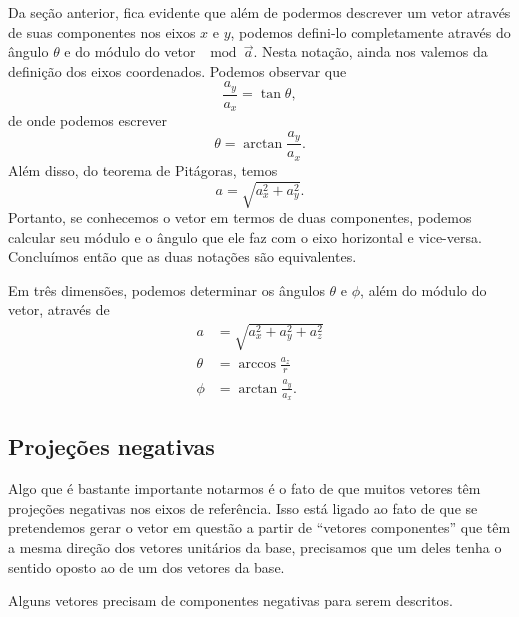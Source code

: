 Da seção anterior, fica evidente que além de podermos descrever um vetor através de suas componentes nos eixos $x$ e $y$, podemos defini-lo completamente através do ângulo $\theta$ e do módulo do vetor $\mod{\vec{a}}$. Nesta notação, ainda nos valemos da definição dos eixos coordenados. Podemos observar que
\begin{equation}
  \frac{a_y}{a_x} = \tan\theta,
\end{equation}
%
de onde podemos escrever
\begin{equation}
  \theta = \arctan\frac{a_y}{a_x}.
\end{equation}
%
Além disso, do teorema de Pitágoras, temos
\begin{equation}
  a = \sqrt{a_ x^2 + a_y^2}.
\end{equation}
%
Portanto, se conhecemos o vetor em termos de duas componentes, podemos calcular seu módulo e o ângulo que ele faz com o eixo horizontal e vice-versa. Concluímos então que as duas notações são equivalentes.

Em três dimensões, podemos determinar os ângulos $\theta$ e $\phi$, além do módulo do vetor, através de
\begin{align}
    a &= \sqrt{a_x^2 + a_y^2 + a_z^2} \\
    \theta &= \arccos \frac{a_z}{r} \\
    \phi &= \arctan \frac{a_y}{a_x}.
\end{align}

\subsection{Projeções negativas}

Algo que é bastante importante notarmos é o fato de que muitos vetores têm projeções negativas nos eixos de referência. Isso está ligado ao fato de que se pretendemos gerar o vetor em questão a partir de ``vetores componentes'' que têm a mesma direção dos vetores unitários da base, precisamos que um deles tenha o sentido oposto ao de um dos vetores da base.

\begin{marginfigure}
\centering
{}
\caption{Alguns vetores precisam de componentes negativas para serem descritos. \label{Fig:VetorCompNegativa}}
\end{marginfigure}

